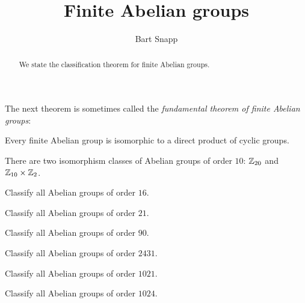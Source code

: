 \documentclass{ximera}
\author{Bart Snapp}
\title{Finite Abelian groups}
\begin{document}
\begin{abstract}
  We state the classification theorem for finite Abelian groups.
\end{abstract}
\maketitle


The next theorem is sometimes called the \textit{fundamental theorem
  of finite Abelian groups}:

\begin{theorem}
  Every finite Abelian group is isomorphic to a direct product of
  cyclic groups.
\end{theorem}



\begin{example}
  There are two isomorphism classes of Abelian groups of order $10$:
  $\mathbb Z_{20}$ and $\mathbb Z_{10}\times\mathbb Z_2$.
\end{example}



\begin{exercise}
  Classify all Abelian groups of order $16$.
\end{exercise}

\begin{exercise}
  Classify all Abelian groups of order $21$.
\end{exercise}

\begin{exercise}
  Classify all Abelian groups of order $90$.
\end{exercise}


\begin{exercise}
  Classify all Abelian groups of order $2431$.
\end{exercise}

\begin{exercise}
  Classify all Abelian groups of order $1021$.
\end{exercise}

\begin{exercise}
  Classify all Abelian groups of order $1024$.
\end{exercise}
\end{document}
